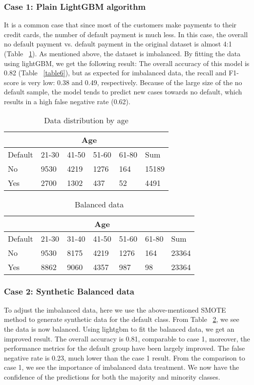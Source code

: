 \documentclass{article}
\begin{document}
\subsubsection{Case 1: Plain LightGBM algorithm}
It is a common case that since most of the customers make payments to their credit cards, the number of default payment is much less. In this case, the overall no default payment vs. default payment in the original dataset is almost 4:1 (Table ~\ref{table2}). As mentioned above, the dataset is imbalanced. By fitting the data using lightGBM, we get the following result:
The overall accuracy of this model is 0.82 (Table ~\ref{table6}), but as expected for imbalanced data, the recall and F1-score is very low: 0.38 and 0.49, respectively. Because of the large size of the no default sample, the model tends to predict new cases towards no default, which results in a high false negative rate (0.62). 
\begin{table}[]
  \caption{Data distribution by age}
  \label{table2}
  \centering
\begin{tabular}{|l|l|l|l|l|l|}
\hline
        & \multicolumn{4}{c|}{Age}      &       \\ \hline
Default & 21-30 & 41-50 & 51-60 & 61-80 & Sum   \\ \hline
No      & 9530  & 4219  & 1276  & 164   & 15189 \\ \hline
Yes     & 2700  & 1302  & 437   & 52    & 4491  \\ \hline
\end{tabular}
\end{table}



\begin{table}[]
 \caption{Balanced data}
  \label{table3}
  \centering
\begin{tabular}{|l|l|l|l|l|l|l|}
\hline
        & \multicolumn{5}{c|}{Age}              &       \\ \hline
Default & 21-30 & 31-40 & 41-50 & 51-60 & 61-80 & Sum   \\ \hline
No      & 9530  & 8175  & 4219  & 1276  & 164   & 23364 \\ \hline
Yes     & 8862  & 9060  & 4357  & 987   & 98    & 23364 \\ \hline
\end{tabular}
\end{table}
\subsubsection{Case 2: Synthetic Balanced data}
To adjust the imbalanced data, here we use the above-mentioned SMOTE method to generate synthetic data for the default class. From Table ~\ref{table3}, we see the data is now balanced. Using lightgbm to fit the balanced data, we get an improved result.
The overall accuracy is 0.81, comparable to case 1, moreover, the performance metrics for the default group have been largely improved. The false negative rate is 0.23, much lower than the case 1 result. 
From the comparison to case 1, we see the importance of imbalanced data treatment. We now have the confidence of the predictions for both the majority and minority classes.
\end{document}
